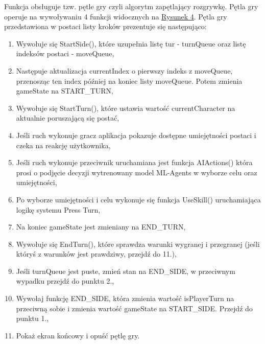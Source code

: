 \documentclass{SGGW-thesis}
\begin{document}
Funkcja obsługuje tzw. pętle gry czyli algorytm zapętlający rozgrywkę. Pętla gry operuje na wywoływaniu 4 funkcji widocznych na \hyperref[fig:UpdateBattle]{Rysunek 4}. Pętla gry przedstawiona w postaci listy kroków prezentuje się następująco:
\begin{enumerate}
  \item{Wywołuje się StartSide(), które uzupełnia listę tur - turnQueue oraz listę indeksów postaci - moveQueue},
  \item{Następuje aktualizacja currentIndex o pierwszy indeks z moveQueue, przenosząc ten index później na koniec listy moveQueue. Potem zmienia gameState na START\_TURN},
  \item{Wywołuje się StartTurn(), które ustawia wartość currentCharacter na aktualnie poruszającą się postać},
  \item{Jeśli ruch wykonuje gracz aplikacja pokazuje dostępne umiejętności postaci i czeka na reakcję użytkownika},
  \pagebreak
  \item{Jeśli ruch wykonuje przeciwnik uruchamiana jest funkcja AIActions() która prosi o podjęcie decyzji wytrenowany model ML-Agents w wyborze celu oraz umiejętności},
  \item{Po wyborze umiejętności i celu wykonuje się funkcja UseSkill() uruchamiająca logikę systemu Press Turn},
  \item{Na koniec gameState jest zmieniany na END\_TURN},
  \item{Wywołuje się EndTurn(), które sprawdza warunki wygranej i przegranej (jeśli któryś z warunków jest prawdziwy, przejdź do 11.)},
  \item{Jeśli turnQueue jest puste, zmień stan na END\_SIDE, w przeciwnym wypadku przejdź do punktu 2.},
  \item{Wywołaj funkcję END\_SIDE, która zmienia wartość isPlayerTurn na przeciwną sobie i zmienia wartość gameState na START\_SIDE. Przejdź do punktu 1.},
  \item{Pokaż ekran końcowy i opuść pętlę gry}.
\end{enumerate}
\end{document}
